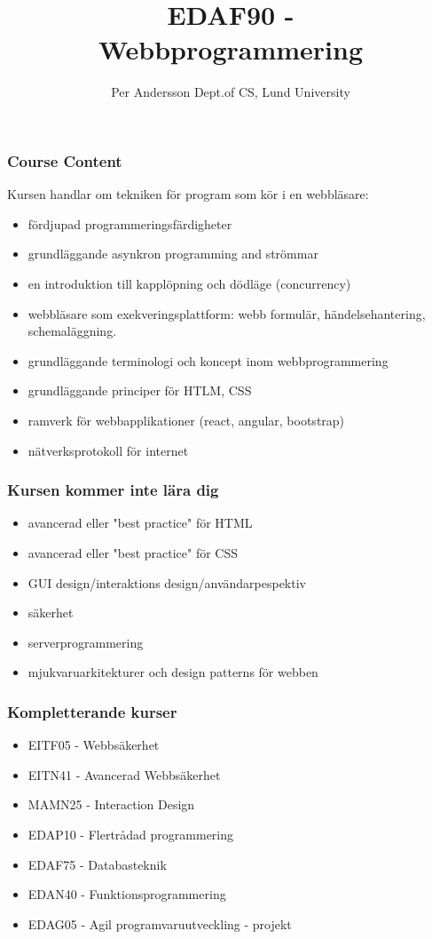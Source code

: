 \documentclass[aspectratio=1610]{beamer}
\title[EDAF90 Webbprogrammering]{EDAF90 - \\Webbprogrammering}
\author[Per Andersson]{%
  Per Andersson\newline
  Dept.\@ of CS, Lund University}
\begin{document}
\begin{frame}[plain]%
  \titlepage
\end{frame}

\begin{frame}
  \frametitle{Course Content}

Kursen handlar om tekniken för program som kör i en webbläsare:
\begin{itemize}
\item fördjupad programmeringsfärdigheter
\item grundläggande asynkron programming and strömmar
\item en introduktion till kapplöpning och dödläge (concurrency)
\item webbläsare som exekveringsplattform: webb formulär, händelsehantering, schemaläggning.
\item grundläggande terminologi och koncept inom webbprogrammering
\item grundläggande principer för HTLM, CSS
\item ramverk för webbapplikationer (react, angular, bootstrap)
\item nätverksprotokoll för internet
\end{itemize}

\end{frame}


\begin{frame}
  \frametitle{Kursen kommer inte lära dig}
\begin{itemize}
\item avancerad eller "best practice" för HTML
\item avancerad eller "best practice" för CSS
\item GUI design/interaktions design/användarpespektiv
\item säkerhet
\item serverprogrammering
\item mjukvaruarkitekturer och design patterns för webben
\end{itemize}

\end{frame}

\begin{frame}
  \frametitle{Kompletterande kurser}
\begin{itemize}
\item EITF05 - Webbsäkerhet
\item EITN41 - Avancerad Webbsäkerhet
\item MAMN25 - Interaction Design
\item EDAP10  - Flertrådad programmering
\item EDAF75 - Databasteknik
\item EDAN40 - Funktionsprogrammering
\item EDAG05 - Agil programvaruutveckling - projekt
\end{itemize}

\end{frame}
\end{document}
